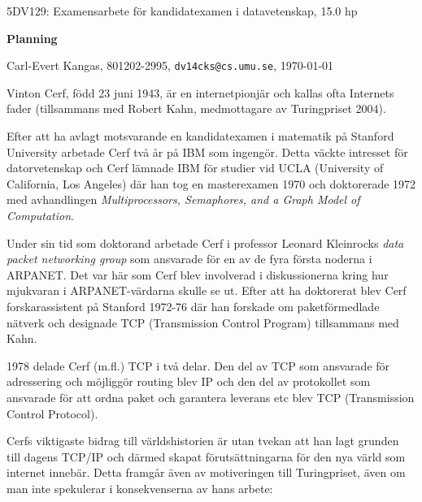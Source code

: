 \documentclass[10pt, titlepage, oneside, a4paper]{article}
\begin{document}
\begin{center}
\begin{large}
5DV129: Examensarbete för kandidatexamen i datavetenskap, 15.0 hp

\textbf{Planning}
\end{large}

Carl-Evert Kangas, 801202-2995, \texttt{dv14cks@cs.umu.se}, \today

\end{center}

\thispagestyle{empty}

Vinton Cerf, född 23 juni 1943, är en internetpionjär och kallas ofta Internets fader (tillsammans med Robert Kahn, medmottagare av Turingpriset 2004).

Efter att ha avlagt motsvarande en kandidatexamen i matematik på Stanford University arbetade Cerf två år på IBM som ingengör. Detta väckte intresset för datorvetenskap och Cerf lämnade IBM för studier vid UCLA (University of California, Los Angeles) där han tog en masterexamen 1970 och doktorerade 1972 med avhandlingen \textit{Multiprocessors, Semaphores, and a Graph Model of Computation}.

Under sin tid som doktorand arbetade Cerf i professor Leonard Kleinrocks \textit{data packet networking group} som ansvarade för en av de fyra första noderna i ARPANET. Det var här som Cerf blev involverad i diskussionerna kring hur mjukvaran i ARPANET-värdarna skulle se ut. Efter att ha doktorerat blev Cerf forskarassistent på Stanford 1972-76 där han forskade om paketförmedlade nätverk och designade TCP (Transmission Control Program) tillsammans med Kahn.

1978 delade Cerf (m.fl.) TCP i två delar. Den del av TCP som ansvarade för adressering och möjliggör routing blev IP och den del av protokollet som ansvarade för att ordna paket och garantera leverans etc blev TCP (Transmission Control Protocol).

\vspace{7mm}


Cerfs viktigaste bidrag till världshistorien är utan tvekan att han lagt grunden till dagens TCP/IP och därmed skapat förutsättningarna för den nya värld som internet innebär.
Detta framgår även av motiveringen till Turingpriset, även om man inte spekulerar i konsekvenserna av hans arbete:
\end{document}
